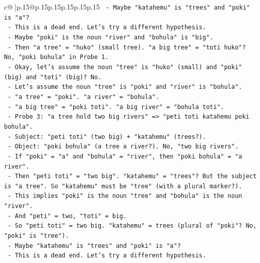 \documentclass{article}
\begin{document}
{\begin{supertabular}{c@{$\;$}|p{.15\linewidth}@{}p{.15\linewidth}p{.15\linewidth}p{.15\linewidth}p{.15\linewidth}p{.15\linewidth}}
{{{\texttt{                      {-} Maybe "katahemu" is "trees" and "poki" is "a"?} \\
\texttt{                      {-} This is a dead end. Let's try a different hypothesis.} \\
\texttt{                      {-} Maybe "poki" is the noun "river" and "bohula" is "big".} \\
\texttt{                      {-} Then "a tree" = "huko" (small tree). "a big tree" = "toti huko"? No, "poki bohula" in Probe 1.} \\
\texttt{                      {-} Okay, let's assume the noun "tree" is "huko" (small) and "poki" (big) and "toti" (big)? No.} \\
\texttt{                      {-} Let's assume the noun "tree" is "poki" and "river" is "bohula".} \\
\texttt{                      {-} "a tree" = "poki". "a river" = "bohula".} \\
\texttt{                      {-} "a big tree" = "poki toti". "a big river" = "bohula toti".} \\
\texttt{                      {-} Probe 3: "a tree hold two big rivers" => "peti toti katahemu poki bohula".} \\
\texttt{                        {-} Subject: "peti toti" (two big) + "katahemu" (trees?).} \\
\texttt{                        {-} Object: "poki bohula" (a tree a river?). No, "two big rivers".} \\
\texttt{                        {-} If "poki" = "a" and "bohula" = "river", then "poki bohula" = "a river".} \\
\texttt{                        {-} Then "peti toti" = "two big". "katahemu" = "trees"? But the subject is "a tree". So "katahemu" must be "tree" (with a plural marker?).} \\
\texttt{                        {-} This implies "poki" is the noun "tree" and "bohula" is the noun "river".} \\
\texttt{                        {-} And "peti" = two, "toti" = big.} \\
\texttt{                        {-} So "peti toti" = two big. "katahemu" = trees (plural of "poki"? No, "poki" is "tree").} \\
\texttt{                        {-} Maybe "katahemu" is "trees" and "poki" is "a"?} \\
\texttt{                        {-} This is a dead end. Let's try a different hypothesis.} \\
}}}
\end{supertabular}}
\end{document}
